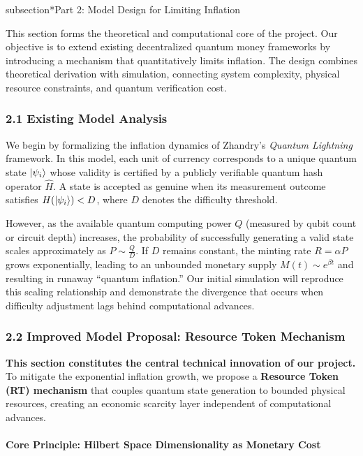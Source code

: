 \documentclass[a4paper,10.5pt,twoside]{article}
\begin{document}
subsection*{Part 2: Model Design for Limiting Inflation}

This section forms the theoretical and computational core of the project.  
Our objective is to extend existing decentralized quantum money frameworks by introducing a mechanism that quantitatively limits inflation.  
The design combines theoretical derivation with simulation, connecting system complexity, physical resource constraints, and quantum verification cost.

\subsubsection*{2.1 Existing Model Analysis}
We begin by formalizing the inflation dynamics of Zhandry’s \textit{Quantum Lightning} framework.  
In this model, each unit of currency corresponds to a unique quantum state $\ket{\psi_i}$ whose validity is certified by a publicly verifiable quantum hash operator $\hat{H}$.  
A state is accepted as genuine when its measurement outcome satisfies $H(\ket{\psi_i}) < D$, where $D$ denotes the difficulty threshold.

However, as the available quantum computing power $Q$ (measured by qubit count or circuit depth) increases,  
the probability of successfully generating a valid state scales approximately as $P \sim \frac{Q}{D}$.  
If $D$ remains constant, the minting rate $R = \alpha P$ grows exponentially, leading to an unbounded monetary supply  
$M(t) \sim e^{\beta t}$ and resulting in runaway ``quantum inflation.''  
Our initial simulation will reproduce this scaling relationship and demonstrate the divergence that occurs when difficulty adjustment lags behind computational advances.

\subsubsection*{2.2 Improved Model Proposal: Resource Token Mechanism}

\textbf{This section constitutes the central technical innovation of our project.}  
To mitigate the exponential inflation growth, we propose a \textbf{Resource Token (RT) mechanism} that couples quantum state generation to bounded physical resources, creating an economic scarcity layer independent of computational advances.

\paragraph{Core Principle: Hilbert Space Dimensionality as Monetary Cost}
\end{document}
